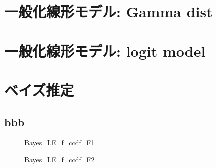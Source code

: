 \documentclass[a4j,11pt,mc]{jreport}
\begin{document}
\chapter{一般化線形モデル: Gamma dist}


\chapter{一般化線形モデル: logit model}

\chapter{ベイズ推定}




\section{bbb}
\begin{figure}[h!]
	\begin{center}
			\caption{Bayes\_LE\_f\_ccdf\_F1}
	\end{center}
\end{figure}


\begin{figure}[h!]
	\begin{center}
			\caption{Bayes\_LE\_f\_ccdf\_F2}
	\end{center}
\end{figure}
\end{document}
